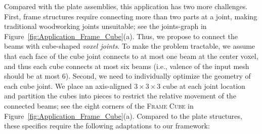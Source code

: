 Compared with the plate assemblies, this application has two more challenges.
First, frame structures require connecting more than two parts at a joint, making traditional woodworking joints unsuitable; see the joints-graph in Figure~\ref{fig:Application_Frame_Cube}(a).
Thus, we propose to connect the beams with cube-shaped {\em voxel joints}.
To make the problem tractable, we assume that each face of the cube joint connects to at most one beam at the center voxel, and thus each cube connects at most six beams (i.e., valence of the input mesh should be at most 6).
Second, we need to individually optimize the geometry of each cube joint. We place an axis-aligned $3 \times 3 \times 3$ cube at each joint location and partition the cubes into pieces to restrict the relative movement of the connected beams; see the eight corners of the \textsc{Frame Cube} in Figure~\ref{fig:Application_Frame_Cube}(a). 
%
Compared to the plate structures, these specifics require the following adaptations to our framework:
